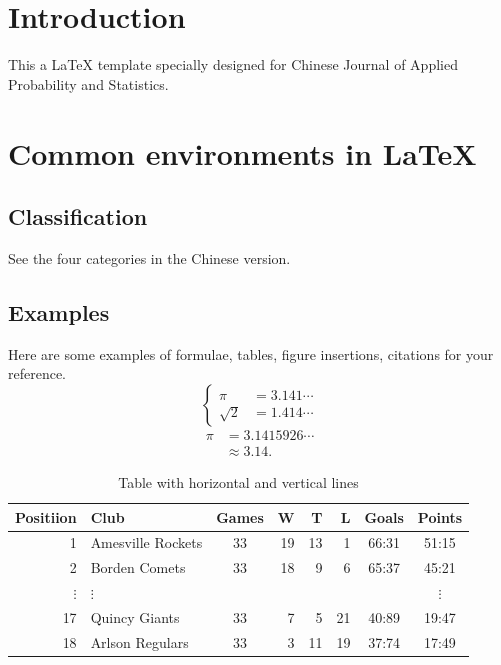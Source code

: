 \documentclass[a4paper,c5size,onecolumn,twoside,nocap,English]{APSart}
\begin{document}
\section{Introduction}

This a \LaTeX{} template specially designed for Chinese Journal of Applied Probability and Statistics.

\section{Common environments in \LaTeX{}}

\subsection{Classification}

See the four categories in the Chinese version.

\subsection{Examples}

Here are some examples of formulae, tables, figure insertions, citations for your reference.
\begin{equation}\label{eq:1}
\left\{ \begin{aligned}
         \pi &= 3.141\cdots \\
     \sqrt{2}&=1.414\cdots
         \end{aligned} \right.
\end{equation}
\begin{align}
	\pi &= 3.1415926\cdots \nonumber \\
		&\approx  3.14.
\end{align}

\begin{table}[htbp]
\centering{}
\caption{Table with horizontal and vertical lines\label{table:1}}
\vskip2mm
\begin{tabular}{r|l||c|rrr|c|c}
\toprule
Positiion & Club & Games & W & T & L & Goals & Points \\ [0.5ex]
\midrule
1 & Amesville Rockets & 33 & 19 & 13 & 1 & 66:31& 51:15\\
2 & Borden Comets & 33 & 18 & 9 & 6 &65:37 & 45:21\\ \hline
$\vdots$& $\vdots$ &&&&& &$\vdots$\\ \hline
17 & Quincy Giants & 33 & 7 & 5 & 21 & 40:89 &19:47\\ \hline
18 & Arlson Regulars & 33 & 3 & 11 &19 & 37:74 &17:49 \\
\bottomrule
\end{tabular}
\end{table}
\end{document}
